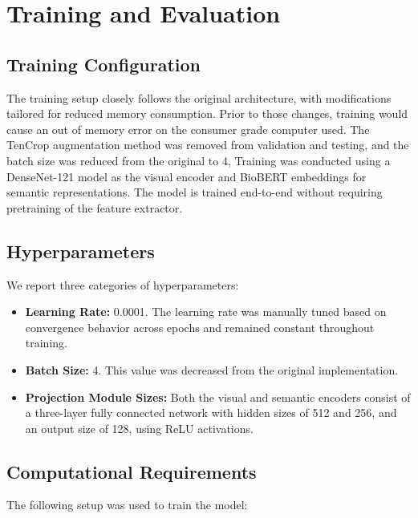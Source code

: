 \documentclass[letterpaper]{article} %
\begin{document}
\section{Training and Evaluation}

\subsection{Training Configuration}

The training setup closely follows the original architecture, with modifications tailored for reduced memory consumption. Prior to those changes, training would cause an out of memory error on the consumer grade computer used. The TenCrop augmentation method was removed from  validation and testing, and the batch size was reduced from the original to 4, Training was conducted using a DenseNet-121 model as the visual encoder and BioBERT embeddings for semantic representations. The model is trained end-to-end without requiring pretraining of the feature extractor.

\subsection{Hyperparameters}

We report three categories of hyperparameters:

\begin{itemize}
    \item \textbf{Learning Rate:} 0.0001. The learning rate was manually tuned based on convergence behavior across epochs and remained constant throughout training.
    \item \textbf{Batch Size:} 4. This value was decreased from the original implementation.
    \item \textbf{Projection Module Sizes:} Both the visual and semantic encoders consist of a three-layer fully connected network with hidden sizes of 512 and 256, and an output size of 128, using ReLU activations.
\end{itemize}

\subsection{Computational Requirements}

The following setup was used to train the model:
\end{document}
